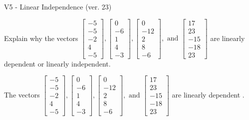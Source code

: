 \begin{exercise}
  \begin{exerciseTitle}V5 - Linear Independence (ver. 23)\end{exerciseTitle}
  \begin{exerciseStatement}
    Explain why the vectors \(\left[\begin{array}{r}
-5 \\
-5 \\
-2 \\
4 \\
-5
\end{array}\right] , \left[\begin{array}{r}
0 \\
-6 \\
1 \\
4 \\
-3
\end{array}\right] , \left[\begin{array}{r}
0 \\
-12 \\
2 \\
8 \\
-6
\end{array}\right] , \text{ and } \left[\begin{array}{r}
17 \\
23 \\
-15 \\
-18 \\
23
\end{array}\right]\) are linearly dependent or linearly independent.	


  \end{exerciseStatement}
  \begin{exerciseAnswer}
   The vectors \(\left[\begin{array}{r}
-5 \\
-5 \\
-2 \\
4 \\
-5
\end{array}\right] , \left[\begin{array}{r}
0 \\
-6 \\
1 \\
4 \\
-3
\end{array}\right] , \left[\begin{array}{r}
0 \\
-12 \\
2 \\
8 \\
-6
\end{array}\right] , \text{ and } \left[\begin{array}{r}
17 \\
23 \\
-15 \\
-18 \\
23
\end{array}\right]\) are 
  	 linearly dependent  .
  


  \end{exerciseAnswer}
\end{exercise}
